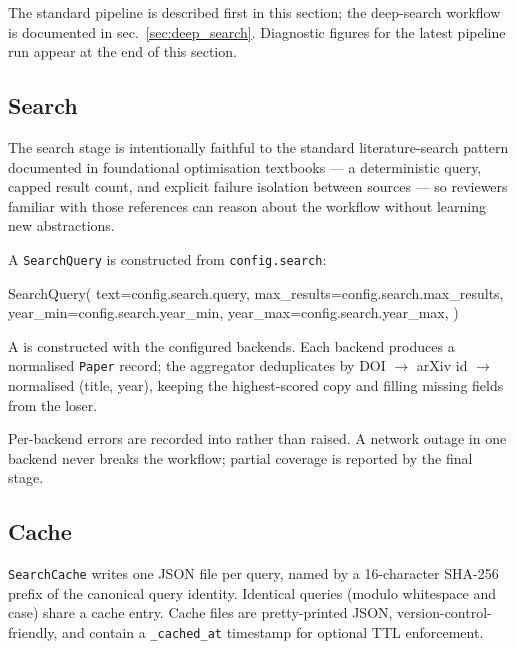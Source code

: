 \documentclass[
]{article}
\newenvironment{Shaded}{}{}
\newcommand{\NormalTok}[1]{#1}
\newcommand{\OperatorTok}[1]{\textcolor[rgb]{0.40,0.40,0.40}{#1}}
\begin{document}
The standard pipeline is described first in this section; the
deep-search workflow is documented in sec.~\ref{sec:deep_search}.
Diagnostic figures for the latest pipeline run appear at the end of this
section.

\subsection{Search}\label{search}

The search stage is intentionally faithful to the standard
literature-search pattern documented in foundational optimisation
textbooks \citep{boyd2004convex, nocedal2006numerical} --- a
deterministic query, capped result count, and explicit failure isolation
between sources --- so reviewers familiar with those references can
reason about the workflow without learning new abstractions.

A \texttt{SearchQuery} is constructed from \texttt{config.search}:

\begin{Shaded}
\begin{Highlighting}[]
\NormalTok{SearchQuery(}
\NormalTok{    text}\OperatorTok{=}\NormalTok{config.search.query,}
\NormalTok{    max\_results}\OperatorTok{=}\NormalTok{config.search.max\_results,}
\NormalTok{    year\_min}\OperatorTok{=}\NormalTok{config.search.year\_min,}
\NormalTok{    year\_max}\OperatorTok{=}\NormalTok{config.search.year\_max,}
\NormalTok{)}
\end{Highlighting}
\end{Shaded}

A  is constructed with the configured backends.
Each backend produces a normalised \texttt{Paper} record; the aggregator
deduplicates by DOI \texorpdfstring{\ensuremath{\to}}{->} arXiv id \texorpdfstring{\ensuremath{\to}}{->} normalised (title, year), keeping the
highest-scored copy and filling missing fields from the loser.

Per-backend errors are recorded into  rather
than raised. A network outage in one backend never breaks the workflow;
partial coverage is reported by the final stage.

\subsection{Cache}\label{cache}

\texttt{SearchCache} writes one JSON file per query, named by a
16-character SHA-256 prefix of the canonical query identity. Identical
queries (modulo whitespace and case) share a cache entry. Cache files
are pretty-printed JSON, version-control-friendly, and contain a
\texttt{\_cached\_at} timestamp for optional TTL enforcement.
\end{document}
